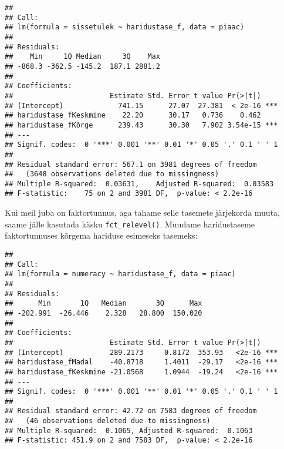 \documentclass[
]{book}
\newenvironment{Shaded}{\begin{snugshade}}{\end{snugshade}}
\newcommand{\AttributeTok}[1]{\textcolor[rgb]{0.77,0.63,0.00}{#1}}
\newcommand{\CommentTok}[1]{\textcolor[rgb]{0.56,0.35,0.01}{\textit{#1}}}
\newcommand{\FunctionTok}[1]{\textcolor[rgb]{0.00,0.00,0.00}{#1}}
\newcommand{\NormalTok}[1]{#1}
\newcommand{\OtherTok}[1]{\textcolor[rgb]{0.56,0.35,0.01}{#1}}
\newcommand{\SpecialCharTok}[1]{\textcolor[rgb]{0.00,0.00,0.00}{#1}}
\newcommand{\StringTok}[1]{\textcolor[rgb]{0.31,0.60,0.02}{#1}}
\begin{document}
\begin{verbatim}
## 
## Call:
## lm(formula = sissetulek ~ haridustase_f, data = piaac)
## 
## Residuals:
##    Min     1Q Median     3Q    Max 
## -868.3 -362.5 -145.2  187.1 2881.2 
## 
## Coefficients:
##                       Estimate Std. Error t value Pr(>|t|)    
## (Intercept)             741.15      27.07  27.381  < 2e-16 ***
## haridustase_fKeskmine    22.20      30.17   0.736    0.462    
## haridustase_fKõrge      239.43      30.30   7.902 3.54e-15 ***
## ---
## Signif. codes:  0 '***' 0.001 '**' 0.01 '*' 0.05 '.' 0.1 ' ' 1
## 
## Residual standard error: 567.1 on 3981 degrees of freedom
##   (3648 observations deleted due to missingness)
## Multiple R-squared:  0.03631,    Adjusted R-squared:  0.03583 
## F-statistic:    75 on 2 and 3981 DF,  p-value: < 2.2e-16
\end{verbatim}

Kui meil juba on faktortunnus, aga tahame selle tasemete järjekorda muuta, saame jälle kasutada käsku \texttt{fct\_relevel()}. Muudame haridustaseme faktortunnuses kõrgema hariduse esimeseks tasemeks:

\begin{Shaded}
\end{Shaded}

\begin{verbatim}
## 
## Call:
## lm(formula = numeracy ~ haridustase_f, data = piaac)
## 
## Residuals:
##      Min       1Q   Median       3Q      Max 
## -202.991  -26.446    2.328   28.800  150.020 
## 
## Coefficients:
##                       Estimate Std. Error t value Pr(>|t|)    
## (Intercept)           289.2173     0.8172  353.93   <2e-16 ***
## haridustase_fMadal    -40.8718     1.4011  -29.17   <2e-16 ***
## haridustase_fKeskmine -21.0568     1.0944  -19.24   <2e-16 ***
## ---
## Signif. codes:  0 '***' 0.001 '**' 0.01 '*' 0.05 '.' 0.1 ' ' 1
## 
## Residual standard error: 42.72 on 7583 degrees of freedom
##   (46 observations deleted due to missingness)
## Multiple R-squared:  0.1065, Adjusted R-squared:  0.1063 
## F-statistic: 451.9 on 2 and 7583 DF,  p-value: < 2.2e-16
\end{verbatim}
\end{document}
